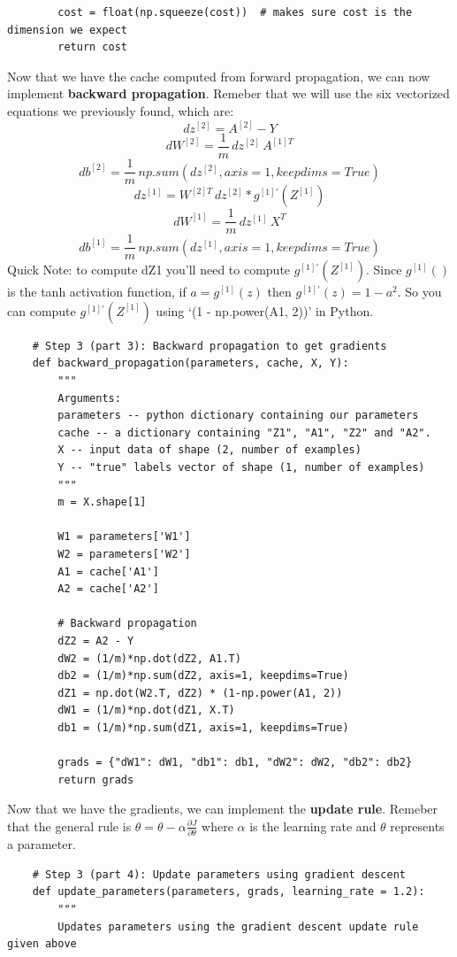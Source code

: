 \documentclass[11pt, a4paper]{article}
\begin{document}
\begin{spacing}{1.1}
\begin{lstlisting}
		cost = float(np.squeeze(cost))  # makes sure cost is the dimension we expect
		return cost \end{lstlisting} \vspace*{1mm}
	Now that we have the cache computed from forward propagation, we can now implement \textbf{backward propagation}. Remeber that we will use the six vectorized equations we previously found, which are: \vspace*{1mm} \\
	$$dz^{[2]} = A^{[2]} - Y$$ 
	$$dW^{[2]} = \frac{1}{m}\, dz^{[2]}\,A^{[1]T}$$
	$$db^{[2]} = \frac{1}{m}\, np.sum(dz^{[2]}, axis=1, keepdims=True)$$ 
	$$dz^{[1]} = W^{[2]T}\,dz^{[2]} * g^{[1]'}(Z^{[1]})$$ 
	$$dW^{[1]} = \frac{1}{m}\, dz^{[1]}\,X^{T}$$
	$$db^{[1]} = \frac{1}{m}\, np.sum(dz^{[1]}, axis=1, keepdims=True)$$
	Quick Note: to compute dZ1 you'll need to compute $g^{[1]'}(Z^{[1]})$. Since $g^{[1]}()$ is the tanh activation function, if $a = g^{[1]}(z)$ then $g^{[1]'}(z) = 1-a^2$. So you can compute $g^{[1]'}(Z^{[1]})$ using `(1 - np.power(A1, 2))' in Python. \newpage

	\begin{lstlisting}
	# Step 3 (part 3): Backward propagation to get gradients
	def backward_propagation(parameters, cache, X, Y):
		"""
		Arguments:
		parameters -- python dictionary containing our parameters 
		cache -- a dictionary containing "Z1", "A1", "Z2" and "A2".
		X -- input data of shape (2, number of examples)
		Y -- "true" labels vector of shape (1, number of examples)
		"""
		m = X.shape[1]

		W1 = parameters['W1']
		W2 = parameters['W2']
		A1 = cache['A1']
		A2 = cache['A2']
		
		# Backward propagation
		dZ2 = A2 - Y
		dW2 = (1/m)*np.dot(dZ2, A1.T)
		db2 = (1/m)*np.sum(dZ2, axis=1, keepdims=True)
		dZ1 = np.dot(W2.T, dZ2) * (1-np.power(A1, 2))
		dW1 = (1/m)*np.dot(dZ1, X.T)
		db1 = (1/m)*np.sum(dZ1, axis=1, keepdims=True)
		
		grads = {"dW1": dW1, "db1": db1, "dW2": dW2, "db2": db2}
		return grads \end{lstlisting}
	Now that we have the gradients, we can implement the \textbf{update rule}. Remeber that the general rule is $ \theta = \theta - \alpha \frac{\partial J }{ \partial \theta }$ where $\alpha$ is the learning rate and $\theta$ represents a parameter.
	\begin{lstlisting}
	# Step 3 (part 4): Update parameters using gradient descent
	def update_parameters(parameters, grads, learning_rate = 1.2):
		"""
		Updates parameters using the gradient descent update rule given above
		

\end{lstlisting}
\end{spacing}
\end{document}
